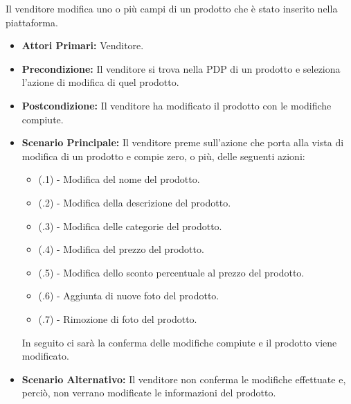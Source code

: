 
Il venditore modifica uno o più campi di un prodotto che è stato inserito nella piattaforma.
\begin{itemize}
    \item \textbf{Attori Primari:} Venditore.
    \item \textbf{Precondizione:} Il venditore si trova nella PDP di un prodotto e seleziona l'azione di modifica di quel prodotto.
    \item \textbf{Postcondizione:} Il venditore ha modificato il prodotto con le modifiche compiute.
    \item \textbf{Scenario Principale:} Il venditore preme sull'azione che porta alla vista di modifica di un prodotto e compie zero, o più, delle seguenti azioni:
    \begin{itemize}
        \item (\actualUC.1) - Modifica del nome del prodotto.
        \item (\actualUC.2) - Modifica della descrizione del prodotto.
        \item (\actualUC.3) - Modifica delle categorie del prodotto.
        \item (\actualUC.4) - Modifica del prezzo del prodotto.
        \item (\actualUC.5) - Modifica dello sconto percentuale al prezzo del prodotto.
        \item (\actualUC.6) - Aggiunta di nuove foto del prodotto.
        \item (\actualUC.7) - Rimozione di foto del prodotto.
    \end{itemize}
    In seguito ci sarà la conferma delle modifiche compiute e il prodotto viene modificato.
    \item \textbf{Scenario Alternativo:} Il venditore non conferma le modifiche effettuate e, perciò, non verrano modificate le informazioni del prodotto.
\end{itemize}

\resetSubUC

